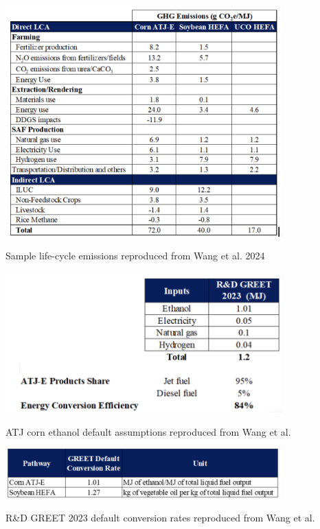 \documentclass[12pt]{article}
\begin{document}
\begin{table}[H]
\centering
\includegraphics[width=0.8\textwidth]{Figures/tb2.png} %
\caption{Sample life-cycle emissions reproduced from Wang et al. 2024}
\label{tab:tb2}
\end{table}


\begin{table}[H]
\centering
\includegraphics[width=0.8\textwidth]{Figures/tb3.png} %
\caption{ATJ corn ethanol default assumptions reproduced from Wang et al.}
\label{fig:tb3}
\end{table}

\begin{table}[H]
\centering
\includegraphics[width=0.8\textwidth]{Figures/tb4.png} %
\caption{R\&D GREET 2023 default conversion rates  reproduced from Wang et al.}
\label{fig:tb4}
\end{table}
\end{document}
